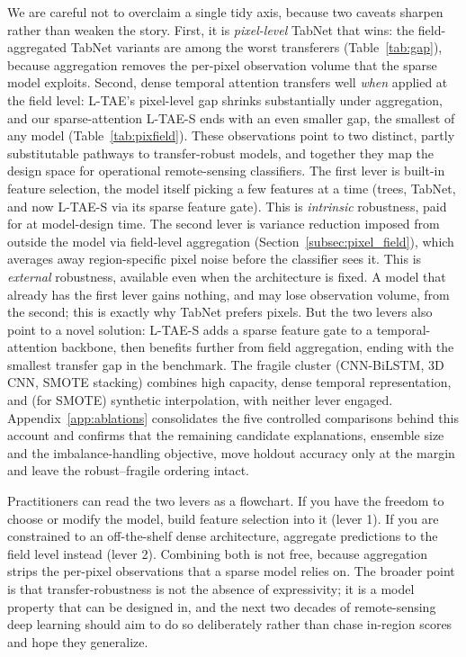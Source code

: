 \documentclass[pdflatex,sn-mathphys]{sn-jnl} %
\begin{document}
We are careful not to overclaim a single tidy axis, because two caveats sharpen
rather than weaken the story. First, it is \emph{pixel-level} TabNet that wins:
the field-aggregated TabNet variants are among the worst transferers
(Table~\ref{tab:gap}), because aggregation removes the per-pixel observation volume
that the sparse model exploits. Second, dense temporal attention transfers well
\emph{when} applied at the field level: L-TAE's pixel-level gap shrinks
substantially under aggregation, and our sparse-attention L-TAE-S ends with
an even smaller gap, the smallest of any model (Table~\ref{tab:pixfield}). These observations point to two distinct, partly substitutable pathways to
transfer-robust models, and together they map the design space for operational
remote-sensing classifiers. The first lever is built-in feature selection, the model
itself picking a few features at a time (trees, TabNet, and now L-TAE-S via its
sparse feature gate). This is \emph{intrinsic} robustness, paid for at model-design
time. The second lever is variance reduction imposed from outside the model via
field-level aggregation (Section~\ref{subsec:pixel_field}), which averages away
region-specific pixel noise before the classifier sees it. This is \emph{external}
robustness, available even when the architecture is fixed. A model that already has
the first lever gains nothing, and may lose observation volume, from the second; this
is exactly why TabNet prefers pixels. But the two levers also point to a novel
solution: L-TAE-S adds a sparse feature gate to a temporal-attention backbone, then
benefits further from field aggregation, ending with the smallest transfer gap in the
benchmark. The fragile cluster (CNN-BiLSTM, 3D CNN, SMOTE stacking) combines high
capacity, dense temporal representation, and (for SMOTE) synthetic interpolation,
with neither lever engaged. Appendix~\ref{app:ablations} consolidates the five
controlled comparisons behind this account and confirms that the remaining
candidate explanations, ensemble size and the imbalance-handling objective, move
holdout accuracy only at the margin and leave the robust--fragile ordering intact.

Practitioners can read the two levers as a flowchart. If you have the freedom to
choose or modify the model, build feature selection into it (lever 1). If you are
constrained to an off-the-shelf dense architecture, aggregate predictions to the
field level instead (lever 2). Combining both is not free, because aggregation
strips the per-pixel observations that a sparse model relies on. The broader point
is that transfer-robustness is not the absence of expressivity; it is a model
property that can be designed in, and the next two decades of remote-sensing deep
learning should aim to do so deliberately rather than chase in-region scores and
hope they generalize.
\end{document}
